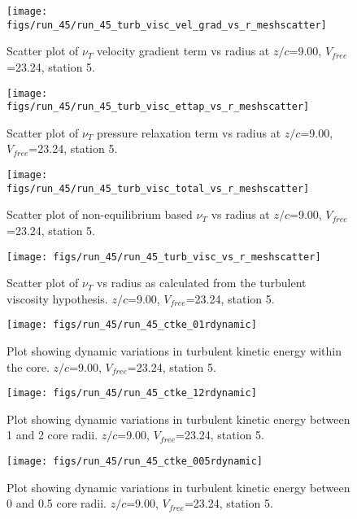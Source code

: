 \begin{figure}[H]
\centering
\texttt{[image: figs/run\_45/run\_45\_turb\_visc\_vel\_grad\_vs\_r\_meshscatter]}
\caption{Scatter plot of $\nu_T$ velocity gradient term vs radius at $z/c$=9.00, $V_{free}$=23.24, station 5.}
\end{figure}


\begin{figure}[H]
\centering
\texttt{[image: figs/run\_45/run\_45\_turb\_visc\_ettap\_vs\_r\_meshscatter]}
\caption{Scatter plot of $\nu_T$ pressure relaxation term vs radius at $z/c$=9.00, $V_{free}$=23.24, station 5.}
\end{figure}


\begin{figure}[H]
\centering
\texttt{[image: figs/run\_45/run\_45\_turb\_visc\_total\_vs\_r\_meshscatter]}
\caption{Scatter plot of non-equilibrium based $\nu_T$ vs radius at $z/c$=9.00, $V_{free}$=23.24, station 5.}
\end{figure}


\begin{figure}[H]
\centering
\texttt{[image: figs/run\_45/run\_45\_turb\_visc\_vs\_r\_meshscatter]}
\caption{Scatter plot of $\nu_T$ vs radius as calculated from the turbulent viscosity hypothesis. $z/c$=9.00, $V_{free}$=23.24, station 5.}
\end{figure}


\begin{figure}[H]
\centering
\texttt{[image: figs/run\_45/run\_45\_ctke\_01rdynamic]}
\caption{Plot showing dynamic variations in turbulent kinetic energy within the core. $z/c$=9.00, $V_{free}$=23.24, station 5.}
\end{figure}


\begin{figure}[H]
\centering
\texttt{[image: figs/run\_45/run\_45\_ctke\_12rdynamic]}
\caption{Plot showing dynamic variations in turbulent kinetic energy between 1 and 2 core radii. $z/c$=9.00, $V_{free}$=23.24, station 5.}
\end{figure}


\begin{figure}[H]
\centering
\texttt{[image: figs/run\_45/run\_45\_ctke\_005rdynamic]}
\caption{Plot showing dynamic variations in turbulent kinetic energy between 0 and 0.5 core radii. $z/c$=9.00, $V_{free}$=23.24, station 5.}
\end{figure}


